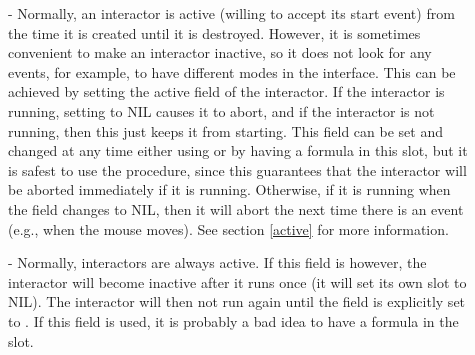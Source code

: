 \begin{description}
\item[] 
- Normally, an interactor is active (willing to accept its start event)
from the time it is created until it is destroyed.  However, it is
sometimes convenient to make an interactor inactive, so it does not look
for any events, for example, to have different modes in the interface.
This can be achieved by setting the active field of the
interactor.  If the interactor is running, setting  to NIL
causes it to abort, and if the interactor is
not running, then this just keeps it from starting.
This field can be set and changed at any time either using
 or by having a formula in this slot, but it is safest to use
the  procedure, since this guarantees that the interactor
will be aborted immediately if it is running.  Otherwise, if it is running
when the  field changes to NIL, then it will abort the next time
there is an event (e.g., when the mouse moves).  See section \ref{active}
for more information.

\item[] 
- Normally, interactors are always active.  If this field is 
however, the interactor will become inactive after
it runs once (it will set its own  slot to NIL).
The interactor will then not run again until the 
field is explicitly set to .  If this field is used, it is probably a
bad idea to have a formula in the  slot.


\end{description}
